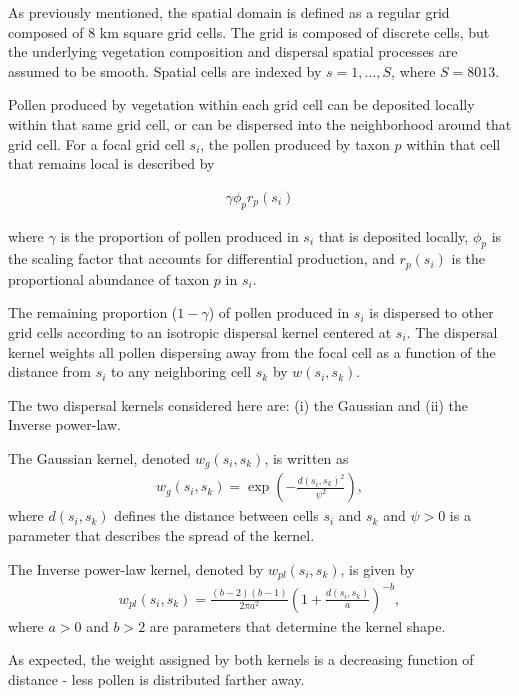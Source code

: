 \documentclass[12pt]{article}
\begin{document}
As previously mentioned, the spatial domain is defined as a regular
grid composed of 8 km square grid cells. The grid is composed of
discrete cells, but the underlying vegetation composition and
dispersal spatial processes are assumed to be smooth. Spatial cells
are indexed by $s=1,\ldots,S$, where $S=8013$.

Pollen produced by vegetation within each grid cell can be deposited
locally within that same grid cell, or can be dispersed into the
neighborhood around that grid cell. For a focal grid cell
$s_i$, the pollen produced by taxon $p$ within that cell that remains
local is described by

\begin{align}
\gamma \phi_p r_p(s_i)
\end{align} 

where $\gamma$ is the proportion of pollen produced in $s_i$ that is deposited locally,
$\phi_p$ is the scaling factor that accounts for differential
production, and $r_p(s_i)$ is the proportional abundance of taxon $p$
in $s_i$.

The remaining proportion ($1-\gamma$) of pollen produced in $s_i$ is
dispersed to other grid cells according to an isotropic dispersal
kernel centered at $s_i$. The dispersal kernel weights all pollen
dispersing away from the focal cell as a function of the distance from
$s_i$ to any neighboring cell $s_k$ by $w(s_i, s_k)$. 

The two dispersal kernels considered here are: (i) the Gaussian and
(ii) the Inverse power-law.

The Gaussian kernel, denoted $w_g(s_i,s_k)$, is written as
\begin{align}
w_g(s_i, s_k) = \exp\left( - \frac{d(s_i, s_k)^2}{\psi^2} \right),
\end{align}
where $d(s_i,s_k)$ defines the distance between cells $s_i$ and $s_k$
and $\psi>0$ is a parameter that describes the spread of the kernel. 

The Inverse power-law kernel, denoted by $w_{pl}(s_i,s_k)$, is given by
\begin{align}
w_{pl}(s_i, s_k) = \frac{(b-2)(b-1)}{2 \pi a^2} \left( 1 + \frac{d(s_i, s_k)}{a} \right)^{-b},
\end{align}
where $a>0$ and $b>2$ are parameters that determine the kernel shape. 

As expected, the weight assigned by both kernels is a decreasing function
of distance - less pollen is distributed farther away.

 
\end{document}
